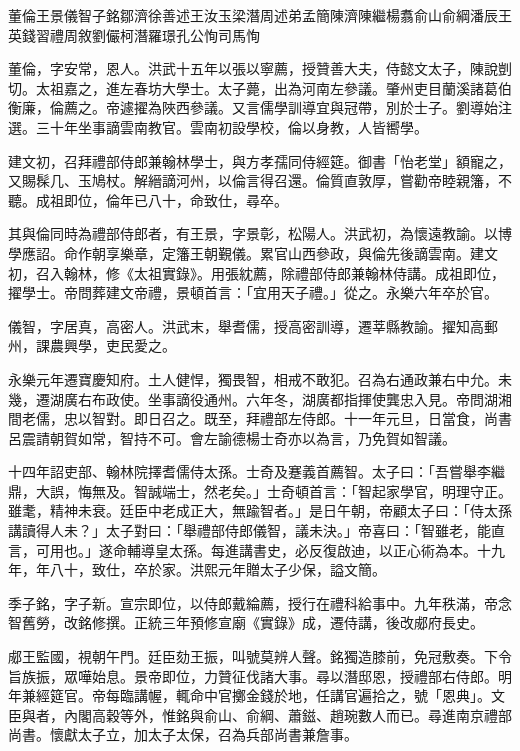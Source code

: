 
\begin{pinyinscope}
董倫王景儀智子銘鄒濟徐善述王汝玉梁潛周述弟孟簡陳濟陳繼楊翥俞山俞綱潘辰王英錢習禮周敘劉儼柯潛羅璟孔公恂司馬恂

董倫，字安常，恩人。洪武十五年以張以寧薦，授贊善大夫，侍懿文太子，陳說剴切。太祖嘉之，進左春坊大學士。太子薨，出為河南左參議。肇州吏目蘭溪諸葛伯衡廉，倫薦之。帝遽擢為陜西參議。又言儒學訓導宜與冠帶，別於士子。劉導始注選。三十年坐事謫雲南教官。雲南初設學校，倫以身教，人皆嚮學。

建文初，召拜禮部侍郎兼翰林學士，與方孝孺同侍經筵。御書「怡老堂」額寵之，又賜髹几、玉鳩杖。解縉謫河州，以倫言得召還。倫質直敦厚，嘗勸帝睦親籓，不聽。成祖即位，倫年已八十，命致仕，尋卒。

其與倫同時為禮部侍郎者，有王景，字景彰，松陽人。洪武初，為懷遠教諭。以博學應詔。命作朝享樂章，定籓王朝覲儀。累官山西參政，與倫先後謫雲南。建文初，召入翰林，修《太祖實錄》。用張紞薦，除禮部侍郎兼翰林侍講。成祖即位，擢學士。帝問葬建文帝禮，景頓首言：「宜用天子禮。」從之。永樂六年卒於官。

儀智，字居真，高密人。洪武末，舉耆儒，授高密訓導，遷莘縣教諭。擢知高郵州，課農興學，吏民愛之。

永樂元年遷寶慶知府。土人健悍，獨畏智，相戒不敢犯。召為右通政兼右中允。未幾，遷湖廣右布政使。坐事謫役通州。六年冬，湖廣都指揮使龔忠入見。帝問湖湘間老儒，忠以智對。即日召之。既至，拜禮部左侍郎。十一年元旦，日當食，尚書呂震請朝賀如常，智持不可。會左諭德楊士奇亦以為言，乃免賀如智議。

十四年詔吏部、翰林院擇耆儒侍太孫。士奇及蹇義首薦智。太子曰：「吾嘗舉李繼鼎，大誤，悔無及。智誠端士，然老矣。」士奇頓首言：「智起家學官，明理守正。雖耄，精神未衰。廷臣中老成正大，無踰智者。」是日午朝，帝顧太子曰：「侍太孫講讀得人未？」太子對曰：「舉禮部侍郎儀智，議未決。」帝喜曰：「智雖老，能直言，可用也。」遂命輔導皇太孫。每進講書史，必反復啟迪，以正心術為本。十九年，年八十，致仕，卒於家。洪熙元年贈太子少保，謚文簡。

季子銘，字子新。宣宗即位，以侍郎戴綸薦，授行在禮科給事中。九年秩滿，帝念智舊勞，改銘修撰。正統三年預修宣廟《實錄》成，遷侍講，後改郕府長史。

郕王監國，視朝午門。廷臣劾王振，叫號莫辨人聲。銘獨造膝前，免冠敷奏。下令旨族振，眾嘩始息。景帝即位，力贊征伐諸大事。尋以潛邸恩，授禮部右侍郎。明年兼經筵官。帝每臨講幄，輒命中官擲金錢於地，任講官遍拾之，號「恩典」。文臣與者，內閣高穀等外，惟銘與俞山、俞綱、蕭鎡、趙琬數人而已。尋進南京禮部尚書。懷獻太子立，加太子太保，召為兵部尚書兼詹事。


\end{pinyinscope}
